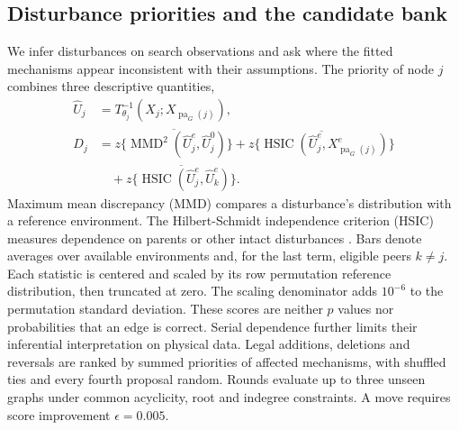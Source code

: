\documentclass{svproc}
\newcommand{\pa}{\operatorname{pa}}
\begin{document}
\subsection{Disturbance priorities and the candidate bank}
We infer disturbances on search observations and ask where the fitted mechanisms
appear inconsistent with their assumptions. The priority of node $j$ combines
three descriptive quantities,
\begin{equation}
\begin{aligned}
 \widehat U_j&=T_{\theta_j}^{-1}(X_j;X_{\pa_G(j)}),\\
 D_j&=\overline{z\{\operatorname{MMD}^2(\widehat U_j^e,\widehat U_j^0)\}}
 +\overline{z\{\operatorname{HSIC}(\widehat U_j^e,X_{\pa_G(j)}^e)\}}\\
 &\quad+\overline{z\{\operatorname{HSIC}(\widehat U_j^e,\widehat U_k^e)\}}.
\end{aligned}
\label{eq:diagnostics}
\end{equation}
Maximum mean discrepancy (MMD) compares a disturbance's distribution with a
reference environment. The Hilbert-Schmidt independence criterion (HSIC) measures
dependence on parents or other intact disturbances \cite{gretton2012,gretton2007}.
Bars denote averages over available environments and, for the last term, eligible
peers $k\ne j$. Each statistic is centered and scaled by its row permutation
reference distribution, then truncated at zero. The scaling denominator adds
$10^{-6}$ to the permutation standard deviation. These scores are neither
$p$ values nor probabilities that an edge is correct. Serial dependence further
limits their inferential interpretation on physical data.
Legal additions, deletions and reversals are ranked by summed priorities of
affected mechanisms, with shuffled ties and every fourth proposal random.
Rounds evaluate up to three unseen graphs under common acyclicity, root and
indegree constraints. A move requires score improvement $\epsilon=0.005$.
\end{document}
